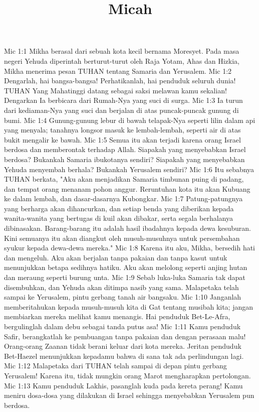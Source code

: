 

\title{Micah}

Mic 1:1  Mikha berasal dari sebuah kota kecil bernama Moresyet. Pada masa negeri Yehuda diperintah berturut-turut oleh Raja Yotam, Ahas dan Hizkia, Mikha menerima pesan TUHAN tentang Samaria dan Yerusalem.
Mic 1:2  Dengarlah, hai bangsa-bangsa! Perhatikanlah, hai penduduk seluruh dunia! TUHAN Yang Mahatinggi datang sebagai saksi melawan kamu sekalian! Dengarkan Ia berbicara dari Rumah-Nya yang suci di surga.
Mic 1:3  Ia turun dari kediaman-Nya yang suci dan berjalan di atas puncak-puncak gunung di bumi.
Mic 1:4  Gunung-gunung lebur di bawah telapak-Nya seperti lilin dalam api yang menyala; tanahnya longsor masuk ke lembah-lembah, seperti air di atas bukit mengalir ke bawah.
Mic 1:5  Semua itu akan terjadi karena orang Israel berdosa dan memberontak terhadap Allah. Siapakah yang menyebabkan Israel berdosa? Bukankah Samaria ibukotanya sendiri? Siapakah yang menyebabkan Yehuda menyembah berhala? Bukankah Yerusalem sendiri?
Mic 1:6  Itu sebabnya TUHAN berkata, "Aku akan menjadikan Samaria timbunan puing di padang, dan tempat orang menanam pohon anggur. Reruntuhan kota itu akan Kubuang ke dalam lembah, dan dasar-dasarnya Kubongkar.
Mic 1:7  Patung-patungnya yang berharga akan dihancurkan, dan setiap benda yang diberikan kepada wanita-wanita yang bertugas di kuil akan dibakar, serta segala berhalanya dibinasakan. Barang-barang itu adalah hasil ibadahnya kepada dewa kesuburan. Kini semuanya itu akan diangkut oleh musuh-musuhnya untuk persembahan syukur kepada dewa-dewa mereka."
Mic 1:8  Karena itu aku, Mikha, bersedih hati dan mengeluh. Aku akan berjalan tanpa pakaian dan tanpa kasut untuk menunjukkan betapa sedihnya hatiku. Aku akan melolong seperti anjing hutan dan meraung seperti burung unta.
Mic 1:9  Sebab luka-luka Samaria tak dapat disembuhkan, dan Yehuda akan ditimpa nasib yang sama. Malapetaka telah sampai ke Yerusalem, pintu gerbang tanah air bangsaku.
Mic 1:10  Janganlah memberitahukan kepada musuh-musuh kita di Gat tentang musibah kita; jangan membiarkan mereka melihat kamu menangis. Hai penduduk Bet-Le-Afra, bergulinglah dalam debu sebagai tanda putus asa!
Mic 1:11  Kamu penduduk Safir, berangkatlah ke pembuangan tanpa pakaian dan dengan perasaan malu! Orang-orang Zaanan tidak berani keluar dari kota mereka. Jeritan penduduk Bet-Haezel menunjukkan kepadamu bahwa di sana tak ada perlindungan lagi.
Mic 1:12  Malapetaka dari TUHAN telah sampai di depan pintu gerbang Yerusalem! Karena itu, tidak mungkin orang Marot mengharapkan pertolongan.
Mic 1:13  Kamu penduduk Lakhis, pasanglah kuda pada kereta perang! Kamu meniru dosa-dosa yang dilakukan di Israel sehingga menyebabkan Yerusalem pun berdosa.
